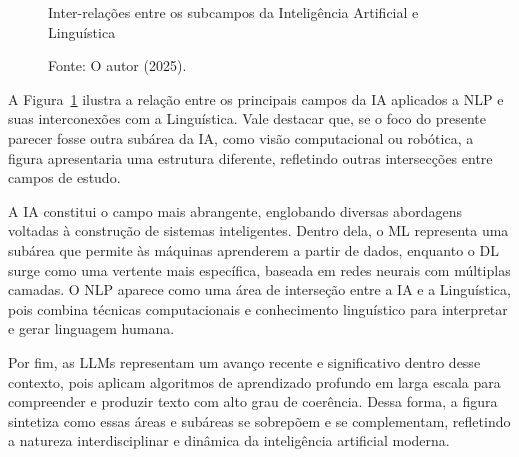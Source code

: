\begin{figure}[H]
\centering
\caption{Inter-relações entre os subcampos da Inteligência Artificial e Linguística}
\caption*{Fonte: O autor (2025).}
\label{fig:vennIA}
\end{figure}

A Figura~\ref{fig:vennIA} ilustra a relação entre os principais campos da IA aplicados a NLP e suas interconexões com a Linguística. Vale destacar que, se o foco do presente parecer fosse outra subárea da IA, como visão computacional ou robótica, a figura apresentaria uma estrutura diferente, refletindo outras intersecções entre campos de estudo.

A IA constitui o campo mais abrangente, englobando diversas abordagens voltadas à construção de sistemas inteligentes. Dentro dela, o ML representa uma subárea que permite às máquinas aprenderem a partir de dados, enquanto o DL surge como uma vertente mais específica, baseada em redes neurais com múltiplas camadas. O NLP aparece como uma área de interseção entre a IA e a Linguística, pois combina técnicas computacionais e conhecimento linguístico para interpretar e gerar linguagem humana. 

Por fim, as LLMs representam um avanço recente e significativo dentro desse contexto, pois aplicam algoritmos de aprendizado profundo em larga escala para compreender e produzir texto com alto grau de coerência. Dessa forma, a figura sintetiza como essas áreas e subáreas se sobrepõem e se complementam, refletindo a natureza interdisciplinar e dinâmica da inteligência artificial moderna.